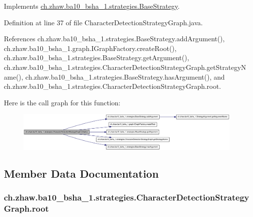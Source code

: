 Implements \hyperlink{classch_1_1zhaw_1_1ba10__bsha__1_1_1strategies_1_1BaseStrategy_af6ea27835befac71906915236a347450}{ch.zhaw.ba10\_\-bsha\_\-1.strategies.BaseStrategy}.

Definition at line 37 of file CharacterDetectionStrategyGraph.java.

References ch.zhaw.ba10\_\-bsha\_\-1.strategies.BaseStrategy.addArgument(), ch.zhaw.ba10\_\-bsha\_\-1.graph.IGraphFactory.createRoot(), ch.zhaw.ba10\_\-bsha\_\-1.strategies.BaseStrategy.getArgument(), ch.zhaw.ba10\_\-bsha\_\-1.strategies.CharacterDetectionStrategyGraph.getStrategyName(), ch.zhaw.ba10\_\-bsha\_\-1.strategies.BaseStrategy.hasArgument(), and ch.zhaw.ba10\_\-bsha\_\-1.strategies.CharacterDetectionStrategyGraph.root.

Here is the call graph for this function:\nopagebreak
\begin{figure}[H]
\begin{center}
\leavevmode
\includegraphics[width=420pt]{classch_1_1zhaw_1_1ba10__bsha__1_1_1strategies_1_1CharacterDetectionStrategyGraph_af9451b15c51430529b038840360a21c6_cgraph}
\end{center}
\end{figure}


\subsection{Member Data Documentation}
\hypertarget{classch_1_1zhaw_1_1ba10__bsha__1_1_1strategies_1_1CharacterDetectionStrategyGraph_a8c963ad3d95559024da1e8f790e4710b}{
\subsubsection[{root}]{ {\bf ch.zhaw.ba10\_\-bsha\_\-1.strategies.CharacterDetectionStrategyGraph.root}}}
\label{classch_1_1zhaw_1_1ba10__bsha__1_1_1strategies_1_1CharacterDetectionStrategyGraph_a8c963ad3d95559024da1e8f790e4710b}


